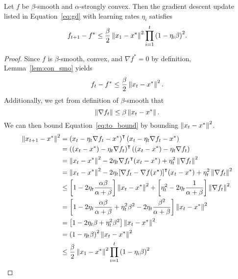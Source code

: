 \begin{theorem}
    Let $f$ be $\beta$-smooth  and $\alpha$-strongly convex. Then the
    gradient descent update listed in Equation~\ref{eq:gd} with learning rates
    $\eta_i$ satisfies
    \begin{equation}
        f_{t+1} - f^* \leq \frac{\beta}{2} \left\| x_1 - x^* \right\|^2\prod_{i = 1}^t {\left( 1 - \eta_i \beta
        \right)}^{2} .
    \end{equation}
\end{theorem}

\begin{proof}
    Since $f$ is $\beta$-smooth, convex, and
    $\nabla f^* = 0$ by definition, Lemma~\ref{lem:con_smo} yields
    \begin{equation}
        \label{eq:to_bound}
        f_t - f^* \leq \frac{\beta}{2} \left\| x_t - x^* \right\|^2.
    \end{equation}
    Additionally, we get from definition of $\beta$-smooth that 
    \begin{equation}
        \left\| \nabla f_t \right\| \leq \beta \left\| x_t - x^* \right\|.
    \end{equation}
    We can then bound Equation~\ref{eq:to_bound} by bounding $\left\| x_t - x^* \right\|^2$.
    \begin{equation}
        \begin{aligned}
            \left\| x_{t + 1} - x^* \right\|^2 &= {\left( x_{t} - \eta_t \nabla f_t - x^*
            \right)}^\intercal \left( x_{t} - \eta_t \nabla f_t - x^* \right)
            \\
            &= {\left( (x_{t} - x^*) - \eta_t \nabla f_t 
            \right)}^\intercal \left( (x_{t}-x^*) - \eta_t \nabla f_t \right)
            \\
            &= \left\| x_t - x^* \right\|^2 - 2\eta_t {\nabla
            f_t}^\intercal (x_t - x^*) + \eta_t^2 \left\| \nabla f_t \right\|^2 \\
            &= \left\| x_t - x^* \right\|^2 - 2\eta_t {[\nabla
            f_t - \nabla f(x^\star)]}^\intercal (x_t - x^*) + \eta_t^2
            \left\| \nabla f_t \right\|^2 \\
            &\leq \left[ 1 - 2\eta_t \frac{\alpha \beta}{\alpha + \beta}
            \right]\left\| x_t - x^* \right\|^2 + \left[  \eta_t^2  - 2\eta_t\frac{1}{\alpha +
            \beta} \right]\left\| \nabla f_t \right\|^2\\
            &= \left[ 1 - 2\eta_t \frac{\alpha \beta}{\alpha + \beta}
              + \eta_t^2\beta^2  - 2\eta_t\frac{\beta^2}{\alpha +
            \beta} \right]\left\| x_t - x^* \right\|^2 \\
            &= \left[ 1 - 2\eta_t \beta 
              + \eta_t^2\beta^2  \right]\left\| x_t - x^* \right\|^2 \\
            &= {\left( 1 -  \eta_t\beta  \right)}^2\left\| x_t - x^* \right\|^2 \\
            &\leq \frac{\beta}{2} \left\| x_1 - x^* \right\|^2\prod_{i = 1}^t {\left( 1 - \eta_i \beta
        \right)}^{2} 
        \end{aligned}
    \end{equation}
\end{proof}

